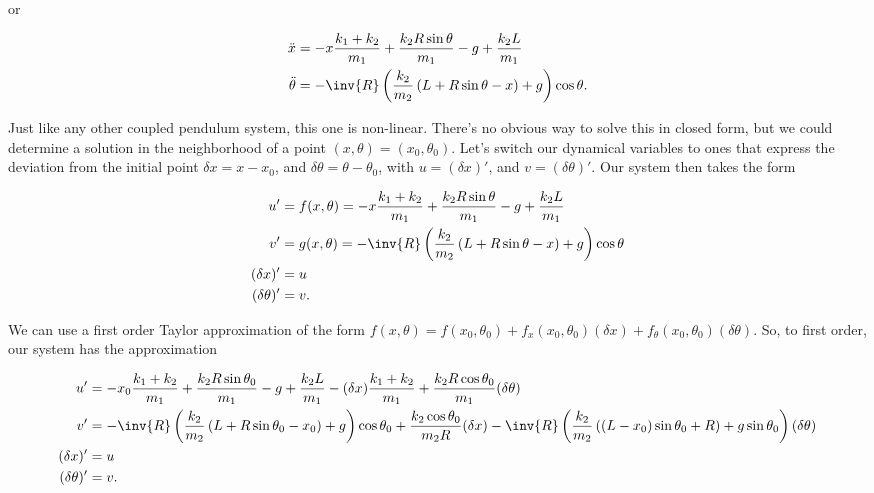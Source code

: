 or

\begin{subequations}
\label{eqn:hoopSpring:3}
\begin{align}
\ddot{x} &= 
-x \frac{k_1 + k_2}{m_1} 
+ \frac{k_2 R \sin\theta}{m_1} 
- g + \frac{k_2 L }{m_1} \\
\ddot{\theta} &= 
- \inv{R}\left( \frac{k_2}{m_2} \left( L + R \sin\theta - x \right) +g \right) \cos\theta
.
\end{align}
\end{subequations}

Just like any other coupled pendulum system, this one is non-linear.  There's no obvious way to solve this in closed form, but we could determine a solution in the neighborhood of a point $(x, \theta) = (x_0, \theta_0)$.  Let's switch our dynamical variables to ones that express the deviation from the initial point $\delta x = x - x_0$, and $\delta \theta = \theta - \theta_0$, with $u = (\delta x)'$, and $v = (\delta \theta)'$.  Our system then takes the form

\begin{subequations}
\label{eqn:hoopSpring:4}
\begin{align}
u' &= f(x,\theta) =
-x \frac{k_1 + k_2}{m_1} 
+ \frac{k_2 R \sin\theta}{m_1} 
- g + \frac{k_2 L }{m_1} \\
v' &= g(x,\theta) =
- \inv{R}\left( \frac{k_2}{m_2} \left( L + R \sin\theta - x \right) +g \right) \cos\theta \\
(\delta x)' &= u \\
(\delta \theta)' &= v
.
\end{align}
\end{subequations}

We can use a first order Taylor approximation of the form $f(x, \theta) = f(x_0, \theta_0) + f_x(x_0,\theta_0) (\delta x) + f_\theta(x_0,\theta_0) (\delta \theta)$.  So, to first order, our system has the approximation

\begin{subequations}
\label{eqn:hoopSpring:5}
\begin{align}
u' &= 
-x_0 \frac{k_1 + k_2}{m_1} 
+ \frac{k_2 R \sin\theta_0}{m_1} 
- g + \frac{k_2 L }{m_1} 
-(\delta x) \frac{k_1 + k_2}{m_1} 
+ \frac{k_2 R \cos\theta_0}{m_1} (\delta \theta)
\\
v' &= 
- \inv{R}\left( \frac{k_2}{m_2} \left( L + R \sin\theta_0 - x_0 \right) +g \right) \cos\theta_0
+ \frac{k_2 \cos\theta_0}{m_2 R} (\delta x)
- \inv{R}\left( \frac{k_2}{m_2} \left( \left( L - x_0 \right) \sin\theta_0 + R \right) + g \sin\theta_0 \right) (\delta \theta)
\\
(\delta x)' &= u \\
(\delta \theta)' &= v
.
\end{align}
\end{subequations}

